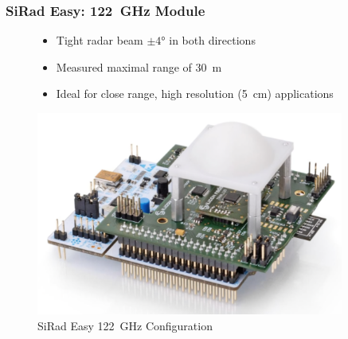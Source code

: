 \documentclass[aspectratio=169]{beamer}
\begin{document}
\begin{frame}[fragile]
  \frametitle{SiRad Easy: 122~GHz Module}
  \begin{figure}[!htb]
    \begin{minipage}{0.48\textwidth}
      \begin{itemize}
        \item Tight radar beam $\pm 4$° in both directions
        \item Measured maximal range of 30~m
        \item Ideal for close range, high resolution (5~cm) applications
      \end{itemize}
    \end{minipage}\hfill
    \begin{minipage}{0.48\textwidth}
      \centering
      \includegraphics[width=0.9\textwidth]{../img/sirad122.png}

      \caption{SiRad Easy 122~GHz Configuration }
    \end{minipage}
  \end{figure}
\end{frame}
\end{document}
